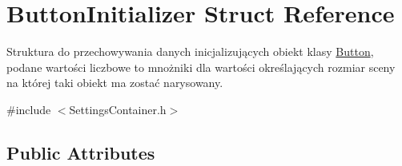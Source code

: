 \hypertarget{struct_button_initializer}{}\section{Button\+Initializer Struct Reference}
\label{struct_button_initializer}


Struktura do przechowywania danych inicjalizujących obiekt klasy \mbox{\hyperlink{class_button}{Button}}, podane wartości liczbowe to mnożniki dla wartości określających rozmiar sceny na której taki obiekt ma zostać narysowany.  




{\ttfamily \#include $<$Settings\+Container.\+h$>$}

\subsection*{Public Attributes}
